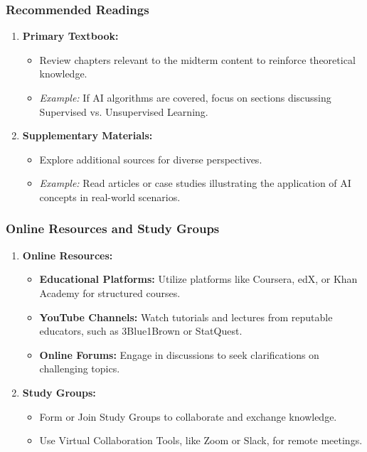 \documentclass[aspectratio=169]{beamer}
\begin{document}
\begin{frame}[fragile]
    \frametitle{Recommended Readings}
    \begin{enumerate}
        \item \textbf{Primary Textbook:} 
            \begin{itemize}
                \item Review chapters relevant to the midterm content to reinforce theoretical knowledge.
                \item \textit{Example:} If AI algorithms are covered, focus on sections discussing Supervised vs. Unsupervised Learning.
            \end{itemize}
        
        \item \textbf{Supplementary Materials:}
            \begin{itemize}
                \item Explore additional sources for diverse perspectives.
                \item \textit{Example:} Read articles or case studies illustrating the application of AI concepts in real-world scenarios.
            \end{itemize}
    \end{enumerate}
\end{frame}

\begin{frame}[fragile]
    \frametitle{Online Resources and Study Groups}
    \begin{enumerate}
        \item \textbf{Online Resources:}
            \begin{itemize}
                \item \textbf{Educational Platforms:} Utilize platforms like Coursera, edX, or Khan Academy for structured courses.
                \item \textbf{YouTube Channels:} Watch tutorials and lectures from reputable educators, such as 3Blue1Brown or StatQuest.
                \item \textbf{Online Forums:} Engage in discussions to seek clarifications on challenging topics.
            \end{itemize}

        \item \textbf{Study Groups:}
            \begin{itemize}
                \item Form or Join Study Groups to collaborate and exchange knowledge.
                \item Use Virtual Collaboration Tools, like Zoom or Slack, for remote meetings.
            \end{itemize}
    \end{enumerate}
\end{frame}
\end{document}
